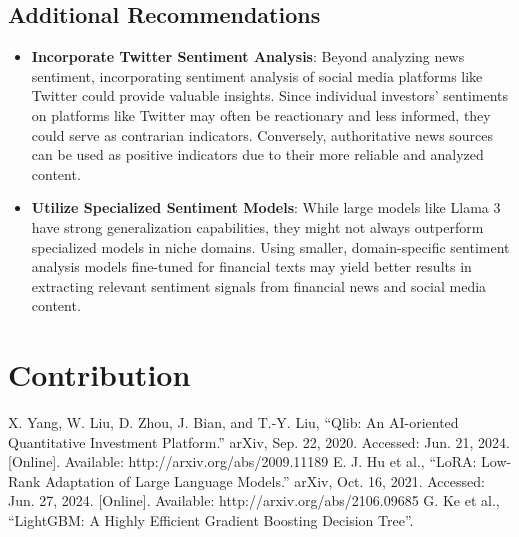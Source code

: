 \documentclass[conference]{IEEEtran}
\begin{document}
\subsection{\textbf{Additional Recommendations}}

\begin{itemize}
    \item \textbf{Incorporate Twitter Sentiment Analysis}: Beyond analyzing news sentiment, incorporating sentiment analysis of social media platforms like Twitter could provide valuable insights. Since individual investors' sentiments on platforms like Twitter may often be reactionary and less informed, they could serve as contrarian indicators. Conversely, authoritative news sources can be used as positive indicators due to their more reliable and analyzed content.
    \item \textbf{Utilize Specialized Sentiment Models}: While large models like Llama 3 have strong generalization capabilities, they might not always outperform specialized models in niche domains. Using smaller, domain-specific sentiment analysis models fine-tuned for financial texts may yield better results in extracting relevant sentiment signals from financial news and social media content.
\end{itemize}

\section{\textbf{Contribution}}

\begin{thebibliography}{00}
     X. Yang, W. Liu, D. Zhou, J. Bian, and T.-Y. Liu, “Qlib: An AI-oriented Quantitative Investment Platform.” arXiv, Sep. 22, 2020. Accessed: Jun. 21, 2024. [Online]. Available: http://arxiv.org/abs/2009.11189
     E. J. Hu et al., “LoRA: Low-Rank Adaptation of Large Language Models.” arXiv, Oct. 16, 2021. Accessed: Jun. 27, 2024. [Online]. Available: http://arxiv.org/abs/2106.09685
     G. Ke et al., “LightGBM: A Highly Efficient Gradient Boosting Decision Tree”.
\end{thebibliography}
\end{document}
